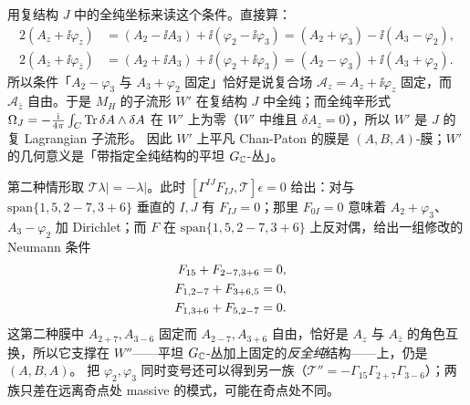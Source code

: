 用复结构 \(J\) 中的全纯坐标来读这个条件。直接算：
\begin{align}
2(A_z+\ii\varphi_z)&=(A_2-\ii A_3)+\ii(\varphi_2-\ii\varphi_3)
=(A_2+\varphi_3)-\ii(A_3-\varphi_2),
\label{eq:J-coord1}\\
2(A_{\bar z}+\ii\varphi_{\bar z})&=(A_2+\ii A_3)+\ii(\varphi_2+\ii\varphi_3)
=(A_2-\varphi_3)+\ii(A_3+\varphi_2).
\label{eq:J-coord2}
\end{align}
\pA{} 所以条件「\(A_2-\varphi_3\) 与 \(A_3+\varphi_2\) 固定」恰好是说复合场 \(\mathcal A_z=A_z+\ii\varphi_z\) 固定，而 \(\mathcal A_{\bar z}\) 自由。于是 \(M_H\) 的子流形 \(W'\) 在复结构 \(J\) 中全纯；而全纯辛形式 \(\Omega_J=-\frac{\mathrm{i}}{4\pi}\int_C\operatorname{Tr}\delta A\wedge\delta A\) 在 \(W'\) 上为零（\(W'\) 中维且 \(\delta A_z=0\)），所以 \(W'\) 是 \(J\) 的复 Lagrangian 子流形。\pA{} 因此 \(W'\) 上平凡 Chan-Paton 的膜是 \((A,B,A)\)-膜；\(W'\) 的几何意义是「带指定全纯结构的平坦 \(G_{\mathbb{C}}\)-丛」。\pA{}

第二种情形取 \(\mathcal T\lambda|=-\lambda|\)。此时 \([\Gamma^{IJ}F_{IJ},\mathcal T]\epsilon=0\) 给出：对与 \(\mathrm{span}\{1,5,2-7,3+6\}\) 垂直的 \(I,J\) 有 \(F_{IJ}=0\)；那里 \(F_{0I}=0\) 意味着 \(A_2+\varphi_3\)、\(A_3-\varphi_2\) 加 Dirichlet；而 \(F\) 在 \(\mathrm{span}\{1,5,2-7,3+6\}\) 上反对偶，给出一组修改的 Neumann 条件
\begin{align}
F_{15}+F_{2-7,3+6}&=0,\notag\\
F_{1,2-7}+F_{3+6,5}&=0,\label{eq:ABA-neu}\\
F_{1,3+6}+F_{5,2-7}&=0.&\notag
\end{align}
\pA{} 这第二种膜中 \(A_{2+7},A_{3-6}\) 固定而 \(A_{2-7},A_{3+6}\) 自由，恰好是 \(A_z\) 与 \(A_{\bar z}\) 的角色互换，所以它支撑在 \(W''\)——平坦 \(G_{\mathbb{C}}\)-丛加上固定的\emph{反全纯}结构——上，仍是 \((A,B,A)\)。\pA{} 把 \(\varphi_2,\varphi_3\) 同时变号还可以得到另一族（\(\mathcal T''=-\Gamma_{15}\Gamma_{2+7}\Gamma_{3-6}\)）；两族只差在远离奇点处 massive 的模式，可能在奇点处不同。\pA{}

